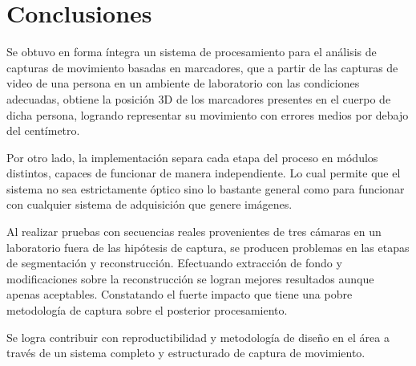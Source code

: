 \section{Conclusiones}

Se obtuvo en forma íntegra un sistema de procesamiento para el análisis de capturas de movimiento basadas en marcadores, que a partir de las capturas de video de una persona en un ambiente de laboratorio con las condiciones adecuadas, obtiene la posición 3D de  los marcadores presentes en el cuerpo de dicha persona, logrando representar su movimiento con errores medios por debajo del centímetro.
%

Por otro lado, la implementación separa cada etapa del proceso en módulos distintos, capaces de funcionar de manera independiente. Lo cual permite que el sistema no sea estrictamente óptico sino lo bastante general como para funcionar con cualquier sistema de adquisición que genere imágenes. %

Al realizar pruebas con secuencias reales  provenientes de tres cámaras en un laboratorio fuera de las hipótesis de captura, se producen problemas en las etapas de segmentación y reconstrucción. Efectuando extracción de fondo y modificaciones sobre la reconstrucción se logran mejores resultados aunque apenas aceptables. Constatando el fuerte impacto que tiene una pobre metodología de captura sobre el posterior procesamiento.

Se logra contribuir con reproductibilidad y metodología de diseño en el área a través de un sistema completo y estructurado de captura de movimiento.
